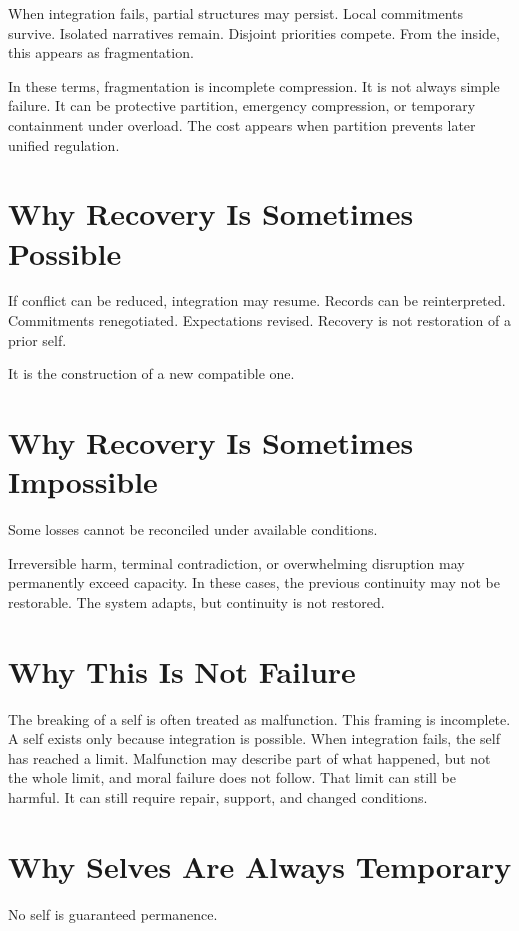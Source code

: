 \documentclass[11pt,twoside,openright]{book}
\begin{document}
When integration fails, partial structures may persist. Local commitments survive. Isolated narratives remain. Disjoint priorities compete. From the inside, this appears as fragmentation.

In these terms, fragmentation is incomplete compression. It is not always simple failure. It can be protective partition, emergency compression, or temporary containment under overload. The cost appears when partition prevents later unified regulation.

\section*{Why Recovery Is Sometimes Possible}

If conflict can be reduced, integration may resume. Records can be reinterpreted. Commitments renegotiated. Expectations revised. Recovery is not restoration of a prior self.

It is the construction of a new compatible one.

\section*{Why Recovery Is Sometimes Impossible}

Some losses cannot be reconciled under available conditions.

Irreversible harm, terminal contradiction, or overwhelming disruption may permanently exceed capacity. In these cases, the previous continuity may not be restorable. The system adapts, but continuity is not restored.

\section*{Why This Is Not Failure}

The breaking of a self is often treated as malfunction. This framing is incomplete. A self exists only because integration is possible. When integration fails, the self has reached a limit. Malfunction may describe part of what happened, but not the whole limit, and moral failure does not follow. That limit can still be harmful. It can still require repair, support, and changed conditions.

\section*{Why Selves Are Always Temporary}

No self is guaranteed permanence.
\end{document}
